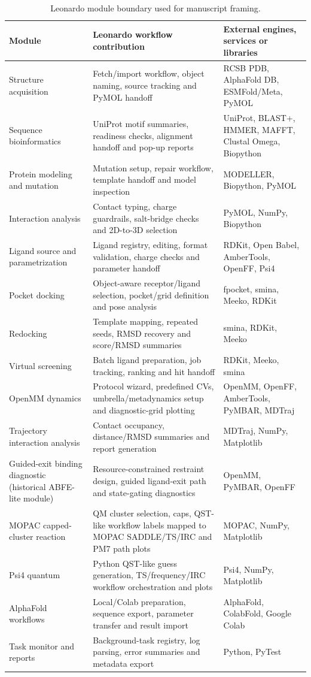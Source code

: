 \documentclass[pdflatex,sn-vancouver-num]{sn-jnl}
\begin{document}
\begin{table}[htbp]
\caption{Leonardo module boundary used for manuscript framing.}\label{tab:pipeline_boundary}
\footnotesize
\begin{tabularx}{\textwidth}{>{\raggedright\arraybackslash}p{}>{\raggedright\arraybackslash}X>{\raggedright\arraybackslash}p{}}
\toprule
Module & Leonardo workflow contribution & External engines, services or libraries \\
\midrule
Structure acquisition & Fetch/import workflow, object naming, source tracking and PyMOL handoff & RCSB PDB, AlphaFold DB, ESMFold/Meta, PyMOL \\
Sequence bioinformatics & UniProt motif summaries, readiness checks, alignment handoff and pop-up reports & UniProt, BLAST+, HMMER, MAFFT, Clustal Omega, Biopython \\
Protein modeling and mutation & Mutation setup, repair workflow, template handoff and model inspection & MODELLER, Biopython, PyMOL \\
Interaction analysis & Contact typing, charge guardrails, salt-bridge checks and 2D-to-3D selection & PyMOL, NumPy, Biopython \\
Ligand source and parametrization & Ligand registry, editing, format validation, charge checks and parameter handoff & RDKit, Open Babel, AmberTools, OpenFF, Psi4 \\
Pocket docking & Object-aware receptor/ligand selection, pocket/grid definition and pose analysis & fpocket, smina, Meeko, RDKit \\
Redocking & Template mapping, repeated seeds, RMSD recovery and score/RMSD summaries & smina, RDKit, Meeko \\
Virtual screening & Batch ligand preparation, job tracking, ranking and hit handoff & RDKit, Meeko, smina \\
OpenMM dynamics & Protocol wizard, predefined CVs, umbrella/metadynamics setup and diagnostic-grid plotting & OpenMM, OpenFF, AmberTools, PyMBAR, MDTraj \\
Trajectory interaction analysis & Contact occupancy, distance/RMSD summaries and report generation & MDTraj, NumPy, Matplotlib \\
Guided-exit binding diagnostic (historical ABFE-lite module) & Resource-constrained restraint design, guided ligand-exit path and state-gating diagnostics & OpenMM, PyMBAR, OpenFF \\
MOPAC capped-cluster reaction & QM cluster selection, caps, QST-like workflow labels mapped to MOPAC SADDLE/TS/IRC and PM7 path plots & MOPAC, NumPy, Matplotlib \\
Psi4 quantum & Python QST-like guess generation, TS/frequency/IRC workflow orchestration and plots & Psi4, NumPy, Matplotlib \\
AlphaFold workflows & Local/Colab preparation, sequence export, parameter transfer and result import & AlphaFold, ColabFold, Google Colab \\
Task monitor and reports & Background-task registry, log parsing, error summaries and metadata export & Python, PyTest \\
\bottomrule
\end{tabularx}
\end{table}
\end{document}
